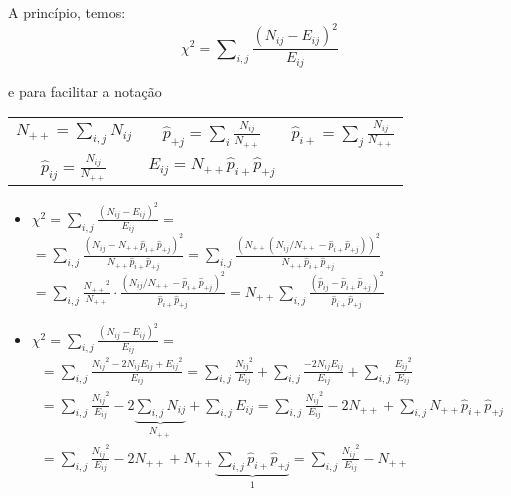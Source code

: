 \item
A princípio, temos:
  \[{\chi ^2} = \sum\nolimits_{i,j} {\frac{{{{\left( {{N_{ij}} - {E_{ij}}} \right)}^2}}}{{{E_{ij}}}}} \]

e para facilitar a notação

\begin{center}
  \begin{tabular}{c c c}
    ${N_{++}} = \sum\nolimits_{i,j} {{N_{ij}}} $
    &
    ${{\hat p}_{ + j}} = \sum\nolimits_i {\frac{{{N_{ij}}}}{{{N_{ +  + }}}}} $
    &
    ${{\hat p}_{i + }} = \sum\nolimits_j {\frac{{{N_{ij}}}}{{{N_{ +  + }}}}} $
    \\
    ${{\hat p}_{ij}} = \frac{{{N_{ij}}}}{{{N_{ +  + }}}}$
    &
    ${E_{ij}} = {N_{ +  + }}{{\hat p}_{i + }}{{\hat p}_{ + j}}$
    &
    \\
  \end{tabular}
\end{center}

\begin{itemize}
  \item $\displaystyle{\chi ^2} = \sum\nolimits_{i,j} {\frac{{{{\left( {{N_{ij}} - {E_{ij}}} \right)}^2}}}{{{E_{ij}}}}}  = $
  \\
  $\displaystyle= \sum\nolimits_{i,j} {\frac{{{{\left( {{N_{ij}} - {N_{ +  + }}{{\hat p}_{i + }}{{\hat p}_{ + j}}} \right)}^2}}}{{{N_{ +  + }}{{\hat p}_{i + }}{{\hat p}_{ + j}}}}}  = \sum\nolimits_{i,j} {\frac{{{{\left( {{N_{ +  + }}\left( {{N_{ij}}/{N_{ +  + }} - {{\hat p}_{i + }}{{\hat p}_{ + j}}} \right)} \right)}^2}}}{{{N_{ +  + }}{{\hat p}_{i + }}{{\hat p}_{ + j}}}}}$
  \\
  $\displaystyle= \sum\nolimits_{i,j} {\frac{{{N_{ +  + }}^2}}{{{N_{ +  + }}}} \cdot \frac{{{{\left( {{N_{ij}}/{N_{ +  + }} - {{\hat p}_{i + }}{{\hat p}_{ + j}}} \right)}^2}}}{{{{\hat p}_{i + }}{{\hat p}_{ + j}}}}}  = {N_{ +  + }}\sum\nolimits_{i,j} {\frac{{{{\left( {{{\hat p}_{ij}} - {{\hat p}_{i + }}{{\hat p}_{ + j}}} \right)}^2}}}{{{{\hat p}_{i + }}{{\hat p}_{ + j}}}}}$

  \item $\displaystyle{\chi ^2} = \sum\nolimits_{i,j} {\frac{{{{\left( {{N_{ij}} - {E_{ij}}} \right)}^2}}}{{{E_{ij}}}}}  = $ \\
  \[\begin{array}{l}
  \displaystyle = \sum\nolimits_{i,j} {\frac{{{N_{ij}}^2 - 2{N_{ij}}{E_{ij}} + {E_{ij}}^2}}{{{E_{ij}}}}}  = \sum\nolimits_{i,j} {\frac{{{N_{ij}}^2}}{{{E_{ij}}}}}  + \sum\nolimits_{i,j} {\frac{{ - 2{N_{ij}}{E_{ij}}}}{{{E_{ij}}}}}  + \sum\nolimits_{i,j} {\frac{{{E_{ij}}^2}}{{{E_{ij}}}}} \\
  = \sum\nolimits_{i,j} {\frac{{{N_{ij}}^2}}{{{E_{ij}}}}}  - 2\underbrace {\sum\nolimits_{i,j} {{N_{ij}}} }_{{N_{ +  + }}} + \sum\nolimits_{i,j} {{E_{ij}}}  = \sum\nolimits_{i,j} {\frac{{{N_{ij}}^2}}{{{E_{ij}}}}}  - 2{N_{ +  + }} + \sum\nolimits_{i,j} {{N_{ +  + }}{{\hat p}_{i + }}{{\hat p}_{ + j}}} \\
  = \sum\nolimits_{i,j} {\frac{{{N_{ij}}^2}}{{{E_{ij}}}}}  - 2{N_{ +  + }} + {N_{ +  + }}\underbrace {\sum\nolimits_{i,j} {{{\hat p}_{i + }}{{\hat p}_{ + j}}} }_1 = \sum\nolimits_{i,j} {\frac{{{N_{ij}}^2}}{{{E_{ij}}}}}  - {N_{ +  + }}
  \end{array}\]
\end{itemize}
